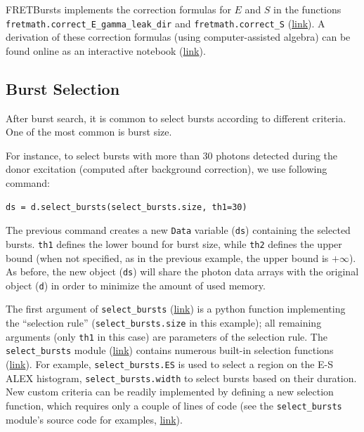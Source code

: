 \documentclass[10pt,letterpaper]{article}
\begin{document}
FRETBursts implements the correction formulas for $E$ and $S$ in the functions
\verb|fretmath.correct_E_gamma_leak_dir| and \verb|fretmath.correct_S|
(\href{http://fretbursts.readthedocs.org/en/latest/fretmath.html}{link}).
A derivation of these correction formulas (using computer-assisted algebra)
can be found online as an interactive notebook (\href{http://nbviewer.jupyter.org/github/tritemio/notebooks/blob/master/Derivation%20of%20FRET%20and%20S%20correction%20formulas.ipynb}{link}).


\subsection*{Burst Selection}
\label{sec:burstsel}

After burst search, it is common to select bursts according to different
criteria. One of the most common is burst size.

For instance, to select bursts with more than 30 photons detected during the donor excitation
(computed after background correction), we use following command:

\begin{lstlisting}
ds = d.select_bursts(select_bursts.size, th1=30)
\end{lstlisting}

The previous command creates a new \verb|Data| variable (\verb|ds|) containing
the selected bursts. \verb|th1| defines the lower bound for burst size, while
\verb|th2| defines the upper bound (when not specified, as in the previous example,
the upper bound is $+\infty$).
As before, the new object (\verb|ds|) will share the photon data
arrays with the original object (\verb|d|) in order to minimize the amount
of used memory.

The first argument of \verb|select_bursts|
(\href{http://fretbursts.readthedocs.org/en/latest/data_class.html#burst-selection-methods}{link})
is a python function implementing the ``selection rule'' (\verb|select_bursts.size| in this example);
all remaining arguments (only \verb|th1| in this case) are parameters of the selection rule.
The \verb|select_bursts| module
(\href{http://fretbursts.readthedocs.org/en/latest/burst_selection.html}{link})
contains numerous built-in selection functions
(\href{http://fretbursts.readthedocs.org/en/latest/burst_selection.html#module-fretbursts.select_bursts}{link}).
For example,
\verb|select_bursts.ES|
is used to select a region on the E-S ALEX histogram,
\verb|select_bursts.width|
to select bursts based on their duration.
New custom criteria can be readily implemented by defining a new selection function,
which requires only a couple of lines of code (see the
\verb|select_bursts| module's source code for examples,
\href{https://github.com/tritemio/FRETBursts/blob/master/fretbursts/select_bursts.py}{link}).
\end{document}
